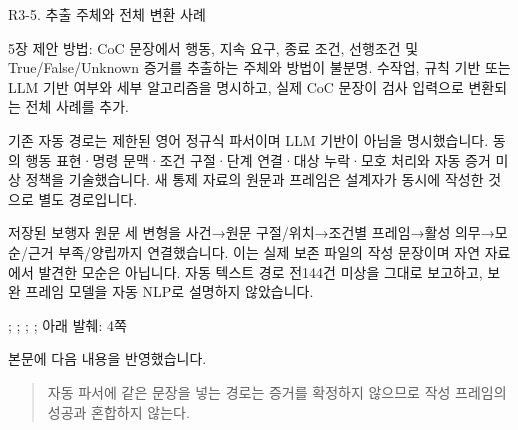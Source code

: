 \begin{reviewitem}{R3-5. 추출 주체와 전체 변환 사례}

\begin{reviewercomment}

5장 제안 방법: CoC 문장에서 행동, 지속 요구, 종료 조건, 선행조건 및 True/False/Unknown 증거를 추출하는 주체와 방법이 불분명. 수작업, 규칙 기반 또는 LLM 기반 여부와 세부 알고리즘을 명시하고, 실제 CoC 문장이 검사 입력으로 변환되는 전체 사례를 추가.

\end{reviewercomment}

\begin{authorresponse}

기존 자동 경로는 제한된 영어 정규식 파서이며 LLM 기반이 아님을 명시했습니다. 동의 행동 표현·명령 문맥·조건 구절·단계 연결·대상 누락·모호 처리와 자동 증거 미상 정책을 기술했습니다. 새 통제 자료의 원문과 프레임은 설계자가 동시에 작성한 것으로 별도 경로입니다.

저장된 보행자 원문 세 변형을 사건→원문 구절/위치→조건별 프레임→활성 의무→모순/근거 부족/양립까지 연결했습니다. 이는 실제 보존 파일의 작성 문장이며 자연 자료에서 발견한 모순은 아닙니다. 자동 텍스트 경로 전144건 미상을 그대로 보고하고, 보완 프레임 모델을 자동 NLP로 설명하지 않았습니다.

\end{authorresponse}

\begin{manuscriptrevision}{; ; ; ; 아래 발췌: 4쪽}

본문에 다음 내용을 반영했습니다.

\begin{quote}

자동 파서에 같은 문장을 넣는 경로는 증거를 확정하지 않으므로 작성 프레임의 성공과 혼합하지 않는다.

\end{quote}

\end{manuscriptrevision}

\end{reviewitem}

\clearpage


